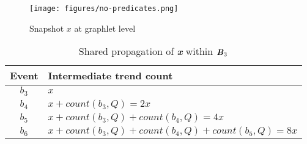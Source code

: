\begin{figure}[h]
\centering
\texttt{[image: figures/no-predicates.png]}
\caption{Snapshot $x$ at graphlet level}
\label{fig:no-predicates}
\end{figure}

\begin{table}[h]
    \centering
    \begin{tabular}{|c|p{8cm}|}
    \hline
        \textbf{Event}
        & \textbf{Intermediate trend count} \\\hline\hline
        $b_3$ 
        & $x$ \\\hline
        $b_4$ 
        & $x + count(b_3,Q) = 2x$ \\\hline
        $b_5$ 
        & $x + count(b_3,Q) + count(b_4,Q) = 4x$ \\\hline
        $b_6$
        & $x + count(b_3,Q) + count(b_4,Q) + count(b_5,Q) = 8x$ \\\hline
    \end{tabular}
    \caption{Shared propagation of \textbf{\textit{x}} within $\textbf{\textit{B}}_3$}
    \label{tab:snapshot}
\end{table}


